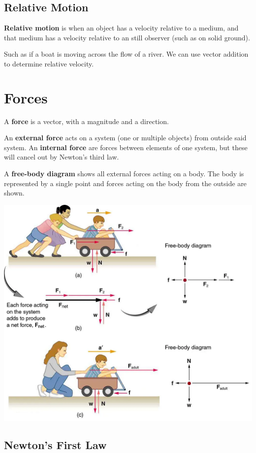 \documentclass{article}
\newcommand{\definition}[1]{\begin{tcolorbox}[colback=red!5!white,colframe=red!75!black,parbox=false] #1 \end{tcolorbox}}
\begin{document}
\subsection{Relative Motion}

\definition{\textbf{Relative motion} is when an object has a velocity relative to a medium, and that medium has a velocity relative to an still observer (such as on solid ground).}

Such as if a boat is moving across the flow of a river. We can use vector addition to determine relative velocity.

\section{Forces}

\definition{A \textbf{force} is a vector, with a magnitude and a direction.}

\definition{An \textbf{external force} acts on a system (one or multiple objects) from outside said system. An \textbf{internal force} are forces between elements of one system, but these will cancel out by Newton's third law.}

\definition{A \textbf{free-body diagram} shows all external forces acting on a body. The body is represented by a single point and forces acting on the body from the outside are shown.}

\begin{center}
	\includegraphics[width=0.75\linewidth]{freebody.png}
\end{center}

\subsection{Newton's First Law}
\end{document}
